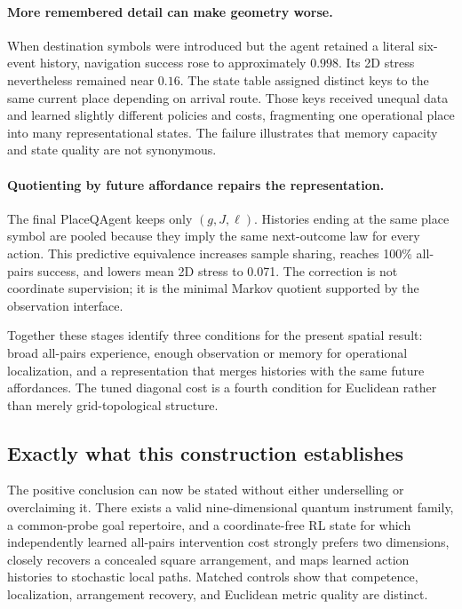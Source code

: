 \documentclass[11pt]{article}
\begin{document}
\paragraph{More remembered detail can make geometry worse.}
When destination symbols were introduced but the agent retained a literal
six-event history, navigation success rose to approximately $0.998$. Its 2D
stress nevertheless remained near $0.16$. The state table assigned distinct
keys to the same current place depending on arrival route. Those keys received
unequal data and learned slightly different policies and costs, fragmenting one
operational place into many representational states. The failure illustrates
that memory capacity and state quality are not synonymous.

\paragraph{Quotienting by future affordance repairs the representation.}
The final PlaceQAgent keeps only $(g,J,\ell)$. Histories ending at the same
place symbol are pooled because they imply the same next-outcome law for every
action. This predictive equivalence increases sample sharing, reaches 100\%
all-pairs success, and lowers mean 2D stress to 0.071. The correction is not
coordinate supervision; it is the minimal Markov quotient supported by the
observation interface.

Together these stages identify three conditions for the present spatial
result: broad all-pairs experience, enough observation or memory for
operational localization, and a representation that merges histories with the
same future affordances. The tuned diagonal cost is a fourth condition for
Euclidean rather than merely grid-topological structure.

\subsection{Exactly what this construction establishes}

The positive conclusion can now be stated without either underselling or
overclaiming it. There exists a valid nine-dimensional quantum instrument
family, a common-probe goal repertoire, and a coordinate-free RL state for
which independently learned all-pairs intervention cost strongly prefers two
dimensions, closely recovers a concealed square arrangement, and maps learned
action histories to stochastic local paths. Matched controls show that
competence, localization, arrangement recovery, and Euclidean metric quality
are distinct.
\end{document}
